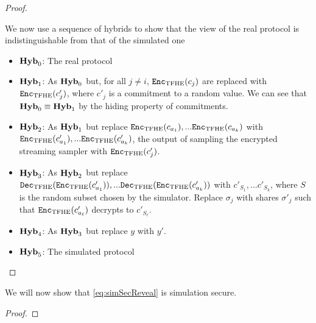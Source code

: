 \begin{lemma}
\begin{proof}
\begin{enumerate}
		\end{enumerate}
		We now use a sequence of hybrids to show that the view of the real protocol is indistinguishable from
		that of the simulated one
		\begin{itemize}
			\item $\mathrm{\textbf{Hyb}}_{0}$: The real protocol
			\item $\mathrm{\textbf{Hyb}}_{1}$: As $\mathrm{\textbf{Hyb}}_{0}$ but, for all $j \neq i$, $\texttt{Enc}_{\mathrm{TFHE}}(c_j)$ are replaced with $\texttt{Enc}_{\mathrm{TFHE}}(c'_j)$, where $c'_j$ is a commitment to a random value.
			We can see that $\mathrm{\textbf{Hyb}}_{0} \equiv \mathrm{\textbf{Hyb}}_{1}$ by the hiding property of commitments.
			\item $\mathrm{\textbf{Hyb}}_{2}$: As $\mathrm{\textbf{Hyb}}_{1}$ but replace $\texttt{Enc}_{\mathrm{TFHE}}(c_{a_1}),... \texttt{Enc}_{\mathrm{TFHE}}(c_{a_k})$ with
			$\texttt{Enc}_{\mathrm{TFHE}}(c'_{a_1}),... \texttt{Enc}_{\mathrm{TFHE}}(c'_{a_k})$, the output of sampling the encrypted streaming sampler with $\texttt{Enc}_{\mathrm{TFHE}}(c'_j)$.
			\item $\mathrm{\textbf{Hyb}}_{3}$: As $\mathrm{\textbf{Hyb}}_{2}$ but replace $\texttt{Dec}_{\mathrm{TFHE}}(\texttt{Enc}_{\mathrm{TFHE}}(c'_{a_1})),... \texttt{Dec}_{\mathrm{TFHE}}(\texttt{Enc}_{\mathrm{TFHE}}(c'_{a_k}))$ with
			$c'_{S_1},... c'_{S_k}$, where $S$ is the random subset chosen by the simulator.
			Replace $\sigma_j$ with shares $\sigma'_j$ such that $\texttt{Enc}_{\mathrm{TFHE}}(c'_{a_\ell})$ decrypts to $c'_{S_\ell}$.
			\item $\mathrm{\textbf{Hyb}}_{4}$: As $\mathrm{\textbf{Hyb}}_{3}$ but replace $y$ with $y'$.
		
			\item $\mathrm{\textbf{Hyb}}_{5}$: The simulated protocol
		\end{itemize}


	\end{proof}
\end{lemma}

\begin{lemma}
	We will now show that \cref{eq:simSecReveal} is simulation secure.
	\begin{proof}

	\end{proof}
\end{lemma}

